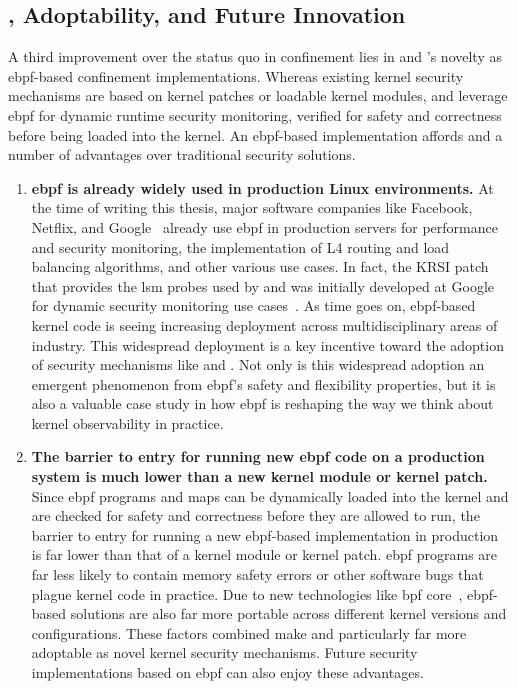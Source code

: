 \subsection{, Adoptability, and Future Innovation}

A third improvement over the status quo in confinement lies in \bpfbox{} and
\bpfcontain{}'s novelty as \gls{ebpf}-based confinement implementations. Whereas existing
kernel security mechanisms are based on kernel patches or loadable kernel modules,
\bpfbox{} and \bpfcontain{} leverage \gls{ebpf} for dynamic runtime security monitoring,
verified for safety and correctness before being loaded into the kernel. An
\gls{ebpf}-based implementation affords \bpfbox{} and \bpfcontain{} a number of advantages
over traditional security solutions.

\begin{enumerate}
  \item \textbf{\gls{ebpf} is already widely used in production Linux environments.} At
  the time of writing this thesis, major software companies like Facebook, Netflix, and
  Google~\cite{gregg2019_bpf} already use \gls{ebpf} in production servers for performance
  and security monitoring, the implementation of L4 routing and load balancing algorithms,
  and other various use cases. In fact, the KRSI patch that provides the \gls{lsm} probes
  used by \bpfbox{} and \bpfcontain{} was initially developed at Google for dynamic
  security monitoring use cases~\cite{singh2019_krsi}. As time goes on, \gls{ebpf}-based
  kernel code is seeing increasing deployment across multidisciplinary areas of industry.
  This widespread deployment is a key incentive toward the adoption of security mechanisms
  like \bpfbox{} and \bpfcontain{}. Not only is this widespread adoption an emergent
  phenomenon from \gls{ebpf}'s safety and flexibility properties, but it is also
  a valuable case study in how \gls{ebpf} is reshaping the way we think about kernel
  observability in practice.

  \item \textbf{The barrier to entry for running new \gls{ebpf} code on a production
  system is much lower than a new kernel module or kernel patch.}
  Since \gls{ebpf} programs and maps can be dynamically loaded into the kernel and are
  checked for safety and correctness before they are allowed to run, the barrier to entry
  for running a new \gls{ebpf}-based implementation in production is far lower than that
  of a kernel module or kernel patch. \gls{ebpf} programs are far less likely to contain
  memory safety errors or other software bugs that plague kernel code in practice. Due to
  new technologies like \gls{bpf} \gls{core}~\cite{nakryiko2020_core}, \gls{ebpf}-based
  solutions are also far more portable across different kernel versions and
  configurations. These factors combined make \bpfbox{} and particularly \bpfcontain{} far
  more adoptable as novel kernel security mechanisms. Future security implementations
  based on \gls{ebpf} can also enjoy these advantages.


\end{enumerate}
